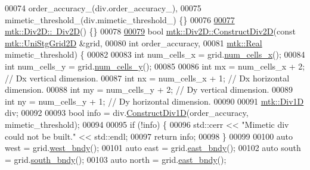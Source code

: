 \begin{DoxyCode}
00074   order\_accuracy\_(div.order\_accuracy\_),
00075   mimetic\_threshold\_(div.mimetic\_threshold\_) \{\}
00076 
\hypertarget{mtk__div__2d_8cc_source_l00077}{}\hyperlink{classmtk_1_1Div2D_a5c10c0d7b974841e923ebe3fda67c468}{00077} \hyperlink{classmtk_1_1Div2D_a5c10c0d7b974841e923ebe3fda67c468}{mtk::Div2D::~Div2D}() \{\}
00078 
\hypertarget{mtk__div__2d_8cc_source_l00079}{}\hyperlink{classmtk_1_1Div2D_a4214055909a6b94fcb9d657cc839055f}{00079} \textcolor{keywordtype}{bool} \hyperlink{classmtk_1_1Div2D_a4214055909a6b94fcb9d657cc839055f}{mtk::Div2D::ConstructDiv2D}(\textcolor{keyword}{const} 
      \hyperlink{classmtk_1_1UniStgGrid2D}{mtk::UniStgGrid2D} &grid,
00080                                 \textcolor{keywordtype}{int} order\_accuracy,
00081                                 \hyperlink{group__c01-roots_gac080bbbf5cbb5502c9f00405f894857d}{mtk::Real} mimetic\_threshold) \{
00082 
00083   \textcolor{keywordtype}{int} num\_cells\_x = grid.\hyperlink{classmtk_1_1UniStgGrid2D_a2d182866a398aba8e4829590e85bf939}{num\_cells\_x}();
00084   \textcolor{keywordtype}{int} num\_cells\_y = grid.\hyperlink{classmtk_1_1UniStgGrid2D_aed05a801cc9a76dba0ff203cea58a61a}{num\_cells\_y}();
00085 
00086   \textcolor{keywordtype}{int} mx = num\_cells\_x + 2;  \textcolor{comment}{// Dx vertical dimension.}
00087   \textcolor{keywordtype}{int} nx = num\_cells\_x + 1;  \textcolor{comment}{// Dx horizontal dimension.}
00088   \textcolor{keywordtype}{int} my = num\_cells\_y + 2;  \textcolor{comment}{// Dy vertical dimension.}
00089   \textcolor{keywordtype}{int} ny = num\_cells\_y + 1;  \textcolor{comment}{// Dy horizontal dimension.}
00090 
00091   \hyperlink{classmtk_1_1Div1D}{mtk::Div1D} div;
00092 
00093   \textcolor{keywordtype}{bool} info = div.\hyperlink{classmtk_1_1Div1D_a52fcd1542f11e606e36bd188e48bfdf7}{ConstructDiv1D}(order\_accuracy, mimetic\_threshold);
00094 
00095   \textcolor{keywordflow}{if} (!info) \{
00096     std::cerr << \textcolor{stringliteral}{"Mimetic div could not be built."} << std::endl;
00097     \textcolor{keywordflow}{return} info;
00098   \}
00099 
00100   \textcolor{keyword}{auto} west = grid.\hyperlink{classmtk_1_1UniStgGrid2D_af2b1712387ded85edaf2b64617d3fc13}{west\_bndy}();
00101   \textcolor{keyword}{auto} east = grid.\hyperlink{classmtk_1_1UniStgGrid2D_a03f689eb29a6369b82ce1207c655d5ff}{east\_bndy}();
00102   \textcolor{keyword}{auto} south = grid.\hyperlink{classmtk_1_1UniStgGrid2D_a1442eaf219f099d0ebf46a170fdebf92}{south\_bndy}();
00103   \textcolor{keyword}{auto} north = grid.\hyperlink{classmtk_1_1UniStgGrid2D_a03f689eb29a6369b82ce1207c655d5ff}{east\_bndy}();

\end{DoxyCode}
